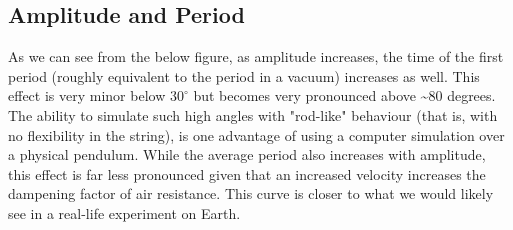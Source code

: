 \documentclass[12pt,a4paper]{article}
\begin{document}
\subsection{Amplitude and Period}
As we can see from the below figure, as amplitude increases, the time of the first period (roughly equivalent to the period in a vacuum) increases as well. This effect is very minor below $30^\circ$ but becomes very pronounced above {\textasciitilde}80 degrees. The ability to simulate such high angles with "rod-like" behaviour (that is, with no flexibility in the string), is one advantage of using a computer simulation over a physical pendulum. While the average period also increases with amplitude, this effect is far less pronounced given that an increased velocity increases the dampening factor of air resistance. This curve is closer to what we would likely see in a real-life experiment on Earth.
\end{document}
